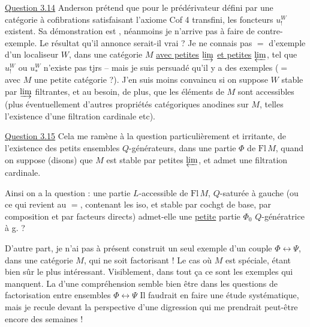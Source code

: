 \uline{Question 3.14} Anderson prétend que pour
le prédérivateur défini par une catégorie
à cofibrations satisfaisant l'axiome Cof 4
transfini, les foncteurs $u^W_!$ existent.
Sa démonstration est  
, néanmoins je n'arrive pas
à faire de contre-exemple. Le résultat
qu'il annonce serait-il vrai ? Je
ne connais pas $=$ d'exemple d'un
localiseur $W$, dans une catégorie $M$
\uline{avec petites} $\varinjlim$ \uline{et petites} $\varprojlim$,
tel que  $u^W_!$ ou $u^W_*$ n'existe
pas tjrs -- mais je suis persuadé
qu'il y a des exemples ($=$ avec $M$
une petite catégorie ?). J'en suis
moins convaincu si on suppose
$W$ stable par $\varinjlim$ filtrantes, et au
besoin, de plus, que les éléments de
$M$ sont accessibles (plus éventuellement
d'autres propriétés catégoriques anodines
sur $M$, telles l'existence d'une filtration
cardinale etc).

\uline{Question 3.15} Cela me ramène à la question particulièrement  et irritante, de l’existence des petits ensembles $Q$-générateurs, dans une partie $\Phi$ de $\mathrm{Fl}\,M$, quand on suppose (disons) que $M$ est stable par petites $\varprojlim$,  et  admet une filtration cardinale.

Ainsi on a la question : une partie $L$-accessible de $\mathrm{Fl}\,M$,  $Q$-saturée  à gauche (ou ce qui revient au $=$, contenant les iso, et stable par cochgt de base, par composition et par facteurs directs) admet-elle une \uline{petite} partie $\Phi_0$ $Q$-génératrice à g. ?

{\reversemarginpar\margin{!\hfill\rule[-3em]{.4pt}{6em}}}
D’autre part, je n’ai pas à présent construit un seul exemple d’un couple $\Phi\longleftrightarrow\Psi$, dans une catégorie $M$, qui ne soit factorisant ! Le cas où $M$ est spéciale, étant bien sûr le plus intéressant. Visiblement, dans tout
ça ce sont les exemples qui manquent. La  d’une compréhension semble bien être dans les questions de factorisation entre ensembles $\Phi\longleftrightarrow\Psi$ Il faudrait en faire une étude systématique, mais je recule devant la perspective d’une digression qui me prendrait peut-être encore des semaines !

